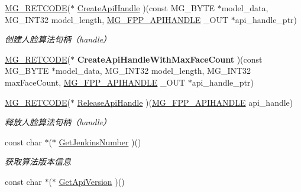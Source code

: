 \begin{DoxyCompactItemize}
\item 
\hyperlink{_m_g___common_8h_a38fecb61b8c39592ddb51f75d4a5c5e7}{M\+G\+\_\+\+R\+E\+T\+C\+O\+DE}($\ast$ \hyperlink{struct_m_g___f_a_c_e_p_p___a_p_i___f_u_n_c_t_i_o_n_s___t_y_p_e_ae5b4677b247cb0c7a882b2542491e0d9}{Create\+Api\+Handle} )(const M\+G\+\_\+\+B\+Y\+TE $\ast$model\+\_\+data, M\+G\+\_\+\+I\+N\+T32 model\+\_\+length, \hyperlink{_m_g___facepp_8h_ada15f635ef909e9aca52824dd580da40}{M\+G\+\_\+\+F\+P\+P\+\_\+\+A\+P\+I\+H\+A\+N\+D\+LE} \+\_\+\+O\+UT $\ast$api\+\_\+handle\+\_\+ptr)
\begin{DoxyCompactList}\small\item\em 创建人脸算法句柄（handle） \end{DoxyCompactList}\item 
\mbox{\label{struct_m_g___f_a_c_e_p_p___a_p_i___f_u_n_c_t_i_o_n_s___t_y_p_e_a06beec1e5183bf9972c7cd35f9d7a571}} 
\hyperlink{_m_g___common_8h_a38fecb61b8c39592ddb51f75d4a5c5e7}{M\+G\+\_\+\+R\+E\+T\+C\+O\+DE}($\ast$ {\bfseries Create\+Api\+Handle\+With\+Max\+Face\+Count} )(const M\+G\+\_\+\+B\+Y\+TE $\ast$model\+\_\+data, M\+G\+\_\+\+I\+N\+T32 model\+\_\+length, M\+G\+\_\+\+I\+N\+T32 max\+Face\+Count, \hyperlink{_m_g___facepp_8h_ada15f635ef909e9aca52824dd580da40}{M\+G\+\_\+\+F\+P\+P\+\_\+\+A\+P\+I\+H\+A\+N\+D\+LE} \+\_\+\+O\+UT $\ast$api\+\_\+handle\+\_\+ptr)
\item 
\hyperlink{_m_g___common_8h_a38fecb61b8c39592ddb51f75d4a5c5e7}{M\+G\+\_\+\+R\+E\+T\+C\+O\+DE}($\ast$ \hyperlink{struct_m_g___f_a_c_e_p_p___a_p_i___f_u_n_c_t_i_o_n_s___t_y_p_e_aff5d16c86e8aa3351cc29ca77c0ad56a}{Release\+Api\+Handle} )(\hyperlink{_m_g___facepp_8h_ada15f635ef909e9aca52824dd580da40}{M\+G\+\_\+\+F\+P\+P\+\_\+\+A\+P\+I\+H\+A\+N\+D\+LE} api\+\_\+handle)
\begin{DoxyCompactList}\small\item\em 释放人脸算法句柄（handle） \end{DoxyCompactList}\item 
const char $\ast$($\ast$ \hyperlink{struct_m_g___f_a_c_e_p_p___a_p_i___f_u_n_c_t_i_o_n_s___t_y_p_e_a497695046f1a90d2a400809e0b0816cd}{Get\+Jenkins\+Number} )()
\begin{DoxyCompactList}\small\item\em 获取算法版本信息 \end{DoxyCompactList}\item 
const char $\ast$($\ast$ \hyperlink{struct_m_g___f_a_c_e_p_p___a_p_i___f_u_n_c_t_i_o_n_s___t_y_p_e_a4cf47a795262d042f354d8ad821109e1}{Get\+Api\+Version} )()

\end{DoxyCompactItemize}
